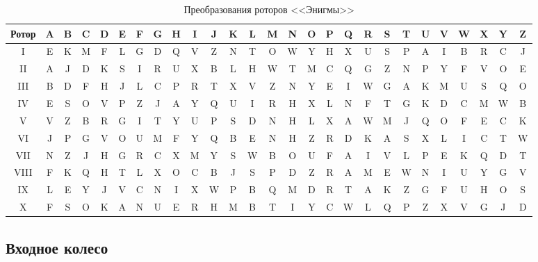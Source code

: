 \begin{table}[h]
\small
\setlength{\tabcolsep}{3pt}
	\begin{center}
		\begin{threeparttable}
		\captionsetup{justification=raggedright,singlelinecheck=off}
		\caption{\label{tbl:rotors} Преобразования роторов <<Энигмы>>}
		\begin{tabular}{|c|c|c|c|c|c|c|c|c|c|c|c|c|c|c|c|c|c|c|c|c|c|c|c|c|c|c|}
			\hline
			Ротор & A & B & C & D & E & F & G & H & I & J & K & L & M & N & O & P & Q & R & S & T & U & V & W & X & Y & Z \\
			\hline
			I & E & K & M & F & L & G & D & Q & V & Z & N & T & O & W & Y & H & X & U & S & P & A & I & B & R & C & J \\
			\hline
			II & A & J & D & K & S & I & R & U & X & B & L & H & W & T & M & C & Q & G & Z & N & P & Y & F & V & O & E \\
			\hline
			III & B & D & F & H & J & L & C & P & R & T & X & V & Z & N & Y & E & I & W & G & A & K & M & U & S & Q & O \\
			\hline
			IV & E & S & O & V & P & Z & J & A & Y & Q & U & I & R & H & X & L & N & F & T & G & K & D & C & M & W & B \\
			\hline
			V& V & Z & B & R & G & I & T & Y & U & P & S & D & N & H & L & X & A & W & M & J & Q & O & F & E & C & K \\
			\hline
			VI & J & P & G & V & O & U & M & F & Y & Q & B & E & N & H & Z & R & D & K & A & S & X & L & I & C & T & W \\
			\hline
			VII & N & Z & J & H & G & R & C & X & M & Y & S & W & B & O & U & F & A & I & V & L & P & E & K & Q & D & T \\
			\hline
			VIII & F & K & Q & H & T & L & X & O & C & B & J & S & P & D & Z & R & A & M & E & W & N & I & U & Y & G & V \\
			\hline
			IX & L & E & Y & J & V & C & N & I & X & W & P & B & Q & M & D & R & T & A & K & Z & G & F & U & H & O & S \\
			\hline
			X & F & S & O & K & A & N & U & E & R & H & M & B & T & I & Y & C & W & L & Q & P & Z & X & V & G & J & D \\
			\hline
		\end{tabular}
		\end{threeparttable}
	\end{center}
	
\end{table}

\subsection{Входное колесо}


